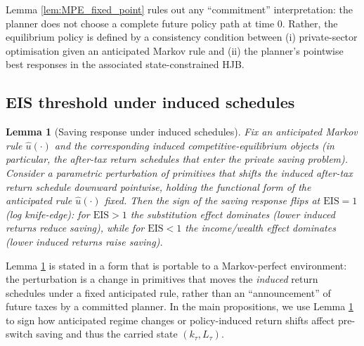 \documentclass{article}
\newtheorem{lemma}{Lemma}
\begin{document}
\begin{remark}
Lemma \ref{lem:MPE_fixed_point} rules out any ``commitment'' interpretation: the planner does not choose a
complete future policy path at time $0$. Rather, the equilibrium policy is defined by a consistency condition
between (i) private-sector optimisation given an anticipated Markov rule and (ii) the planner's pointwise best
responses in the associated state-constrained HJB.
\end{remark}


\subsection{EIS threshold under induced schedules}\label{subsec:block4_EIS}

\begin{lemma}[Saving response under induced schedules]\label{lem:EIS_induced}
Fix an anticipated Markov rule $\widehat u(\cdot)$ and the corresponding induced competitive-equilibrium objects
(in particular, the after-tax return schedules that enter the private saving problem). Consider a parametric
perturbation of primitives that shifts the induced after-tax return schedule \emph{downward pointwise}, holding the
functional form of the anticipated rule $\widehat u(\cdot)$ fixed. Then the sign of the saving response flips at
$\mathrm{EIS}=1$ (log knife-edge): for $\mathrm{EIS}>1$ the substitution effect dominates (lower induced returns reduce
saving), while for $\mathrm{EIS}<1$ the income/wealth effect dominates (lower induced returns raise saving).
\end{lemma}

\begin{remark}
Lemma \ref{lem:EIS_induced} is stated in a form that is portable to a Markov-perfect environment: the perturbation is
a change in primitives that moves the \emph{induced} return schedules under a fixed anticipated rule, rather than an
``announcement'' of future taxes by a committed planner. In the main propositions, we use Lemma \ref{lem:EIS_induced}
to sign how anticipated regime changes or policy-induced return shifts affect pre-switch saving and thus the carried
state $(k_\tau,L_\tau)$.
\end{remark}

\end{document}
